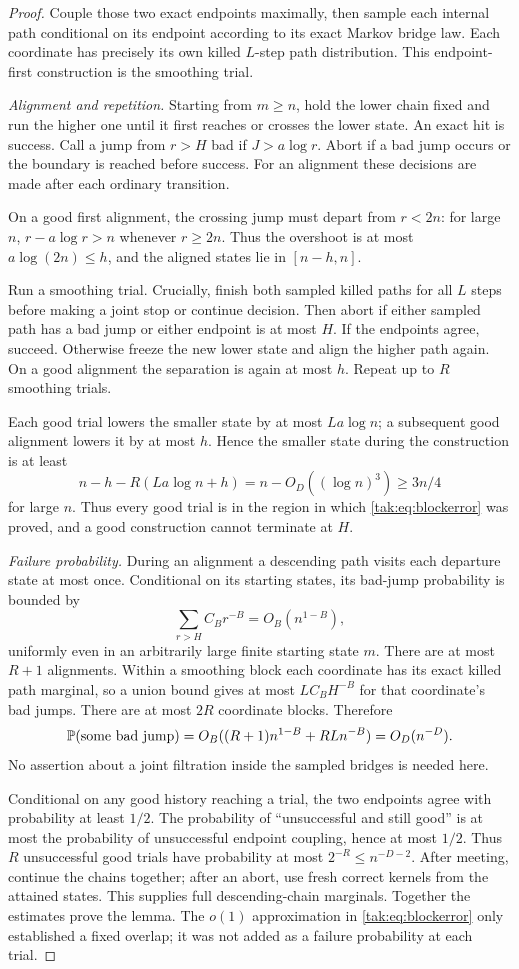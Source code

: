 \documentclass[11pt,letterpaper]{article}
\theoremstyle{remark}\newtheorem{remark}[theorem]{Remark}
\begin{document}
\begin{proof}
Couple those two exact endpoints maximally, then sample each internal path conditional on its endpoint according to its exact Markov bridge law. Each coordinate has precisely its own killed $L$-step path distribution. This endpoint-first construction is the smoothing trial.

\textit{Alignment and repetition.} Starting from $m\geq n$, hold the lower chain fixed and run the higher one until it first reaches or crosses the lower state. An exact hit is success. Call a jump from $r>H$ bad if $J>a\log r$. Abort if a bad jump occurs or the boundary is reached before success. For an alignment these decisions are made after each ordinary transition.

On a good first alignment, the crossing jump must depart from $r<2n$: for large $n$, $r-a\log r>n$ whenever $r\geq2n$. Thus the overshoot is at most $a\log(2n)\leq h$, and the aligned states lie in $[n-h,n]$.

Run a smoothing trial. Crucially, finish both sampled killed paths for all $L$ steps before making a joint stop or continue decision. Then abort if either sampled path has a bad jump or either endpoint is at most $H$. If the endpoints agree, succeed. Otherwise freeze the new lower state and align the higher path again. On a good alignment the separation is again at most $h$. Repeat up to $R$ smoothing trials.

Each good trial lowers the smaller state by at most $La\log n$; a subsequent good alignment lowers it by at most $h$. Hence the smaller state during the construction is at least
\[
 n-h-R(La\log n+h)=n-O_D((\log n)^3)\geq3n/4
\]
for large $n$. Thus every good trial is in the region in which \eqref{tak:eq:blockerror} was proved, and a good construction cannot terminate at $H$.

\textit{Failure probability.} During an alignment a descending path visits each departure state at most once. Conditional on its starting states, its bad-jump probability is bounded by
\[
 \sum_{r>H}C_Br^{-B}=O_B(n^{1-B}),
\]
uniformly even in an arbitrarily large finite starting state $m$. There are at most $R+1$ alignments. Within a smoothing block each coordinate has its exact killed path marginal, so a union bound gives at most $LC_BH^{-B}$ for that coordinate's bad jumps. There are at most $2R$ coordinate blocks. Therefore
\[
 \mathbb P(\hbox{some bad jump})
       =O_B((R+1)n^{1-B}+RLn^{-B})=O_D(n^{-D}).
\]
No assertion about a joint filtration inside the sampled bridges is needed here.

Conditional on any good history reaching a trial, the two endpoints agree with probability at least $1/2$. The probability of ``unsuccessful and still good'' is at most the probability of unsuccessful endpoint coupling, hence at most $1/2$. Thus $R$ unsuccessful good trials have probability at most
$2^{-R}\leq n^{-D-2}$. After meeting, continue the chains together; after an abort, use fresh correct kernels from the attained states. This supplies full descending-chain marginals. Together the estimates prove the lemma. The $o(1)$ approximation in \eqref{tak:eq:blockerror} only established a fixed overlap; it was not added as a failure probability at each trial.
\end{proof}
\end{document}
